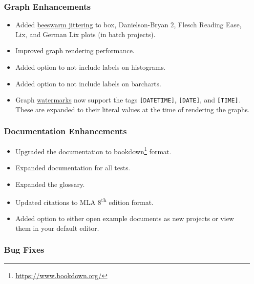 \documentclass[
]{book}
\DeclareRobustCommand{\href}[2]{#2\footnote{\url{#1}}}
\providecommand{\tightlist}{%
  \setlength{\itemsep}{0pt}\setlength{\parskip}{0pt}}
\theoremstyle{definition}
\theoremstyle{definition}
\theoremstyle{definition}
\theoremstyle{definition}
\theoremstyle{remark}
\begin{document}
\hypertarget{graph-enhancements}{%
\subsubsection*{Graph Enhancements}\label{graph-enhancements}}

\begin{itemize}
\tightlist
\item
  Added \protect\hyperlink{stats-issues}{beeswarm jittering} to box, Danielson-Bryan 2, Flesch Reading Ease, Lix, and German Lix plots (in batch projects).
\item
  Improved graph rendering performance.
\item
  Added option to not include labels on histograms.
\item
  Added option to not include labels on barcharts.
\item
  Graph \protect\hyperlink{watermark-and-logo}{watermarks} now support the tags \texttt{{[}DATETIME{]}}, \texttt{{[}DATE{]}}, and \texttt{{[}TIME{]}}. These are expanded to their literal values at the time of rendering the graphs.
\end{itemize}

\hypertarget{documentation-enhancements}{%
\subsubsection*{Documentation Enhancements}\label{documentation-enhancements}}

\begin{itemize}
\tightlist
\item
  Upgraded the documentation to \href{https://www.bookdown.org/}{bookdown} format.
\item
  Expanded documentation for all tests.
\item
  Expanded the glossary.
\item
  Updated citations to MLA 8\textsuperscript{th} edition format.
\item
  Added option to either open example documents as new projects or view them in your default editor.
\end{itemize}

\hypertarget{bug-fixes}{%
\subsubsection*{Bug Fixes}\label{bug-fixes}}
\end{document}

